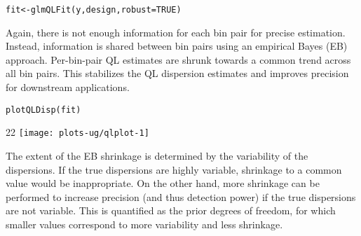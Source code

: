 \documentclass{report}\usepackage[]{graphicx}\usepackage[usenames,dvipsnames]{color}
\makeatletter
\def\maxwidth{ %
  \ifdim\Gin@nat@width>\linewidth
    \linewidth
  \else
    \Gin@nat@width
  \fi
}
\newcommand{\hlnum}[1]{\textcolor[rgb]{0.816,0.125,0.439}{#1}}%
\newcommand{\hlopt}[1]{\textcolor[rgb]{0,0,0}{#1}}%
\newcommand{\hlstd}[1]{\textcolor[rgb]{0.251,0.251,0.251}{#1}}%
\newcommand{\hlkwb}[1]{\textcolor[rgb]{0,0,0}{#1}}%
\newcommand{\hlkwc}[1]{\textcolor[rgb]{0.251,0.251,0.251}{#1}}%
\newcommand{\hlkwd}[1]{\textcolor[rgb]{0.878,0.439,0.125}{#1}}%
\newenvironment{knitrout}{}{} %
\makeatother
\begin{document}
\begin{knitrout}
\color{fgcolor}\begin{kframe}
\begin{alltt}
\hlstd{fit} \hlkwb{<-} \hlkwd{glmQLFit}\hlstd{(y, design,} \hlkwc{robust}\hlstd{=}\hlnum{TRUE}\hlstd{)}
\end{alltt}
\end{kframe}
\end{knitrout}

Again, there is not enough information for each bin pair for precise estimation.
Instead, information is shared between bin pairs using an empirical Bayes (EB) approach.
Per-bin-pair QL estimates are shrunk towards a common trend across all bin pairs.
This stabilizes the QL dispersion estimates and improves precision for downstream applications.

\begin{knitrout}
\color{fgcolor}\begin{kframe}
\begin{alltt}
\hlkwd{plotQLDisp}\hlstd{(fit)}
\end{alltt}
\end{kframe}\begin{adjustwidth}{2\fltoffset}{2\fltoffset}
\texttt{[image: plots-ug/qlplot-1]} \end{adjustwidth}
\end{knitrout}

The extent of the EB shrinkage is determined by the variability of the dispersions.
If the true dispersions are highly variable, shrinkage to a common value would be inappropriate.
On the other hand, more shrinkage can be performed to increase precision (and thus detection power) if the true dispersions are not variable.
This is quantified as the prior degrees of freedom, for which smaller values correspond to more variability and less shrinkage.

\begin{knitrout}
\color{fgcolor}
\end{knitrout}
\end{document}
